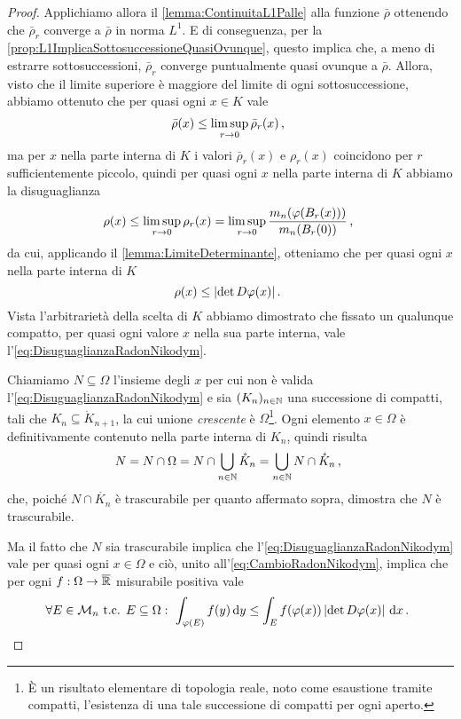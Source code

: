 \begin{proof}
	Applichiamo allora il \cref{lemma:ContinuitaL1Palle} alla funzione $\bar\rho$ ottenendo che $\bar\rho_r$ converge a $\bar\rho$ in norma $L^1$.
	E di conseguenza, per la \cref{prop:L1ImplicaSottosuccessioneQuasiOvunque}, questo implica che, a meno di estrarre sottosuccessioni, $\bar\rho_r$ converge puntualmente quasi ovunque a $\bar\rho$.
	Allora, visto che il limite superiore è maggiore del limite di ogni sottosuccessione, abbiamo ottenuto che per quasi ogni $x\in K$ vale
	\begin{equation*}
		\bar\rho(x)\le \limsup_{r\to 0} \bar\rho_r(x)\, \text{, }
	\end{equation*}
	ma per $x$ nella parte interna di $K$ i valori $\bar\rho_r(x)$ e $\rho_r(x)$ coincidono per $r$ sufficientemente piccolo, quindi per quasi ogni $x$ nella parte interna di $K$ abbiamo la disuguaglianza
	\begin{equation*}
		\rho(x)\le \limsup_{r\to 0} \rho_r(x)=\limsup_{r\to 0} \frac{m_n(\varphi(B_r(x)))}{m_n(B_r(0))}\, \text{, }
	\end{equation*}
	da cui, applicando il \cref{lemma:LimiteDeterminante}, otteniamo che per quasi ogni $x$ nella parte interna di $K$
	\begin{equation}\label{eq:DisuguaglianzaRadonNikodym}
		\rho(x)\le \lvert \det D\varphi(x)\rvert \, \text{. }
	\end{equation}
	Vista l'arbitrarietà della scelta di $K$ abbiamo dimostrato che fissato un qualunque compatto, per quasi ogni valore $x$ nella sua parte interna, vale l'\cref{eq:DisuguaglianzaRadonNikodym}. 
	
	Chiamiamo $N\subseteq\Omega$ l'insieme degli $x$ per cui non è valida l'\cref{eq:DisuguaglianzaRadonNikodym} e sia $(K_n)_{n\in\mathbb N}$ una successione di compatti, tali che $K_n\subseteq \mathring K_{n+1}$, la cui unione \emph{crescente} è $\Omega$\footnote{È un risultato elementare di topologia reale, noto come esaustione tramite compatti, l'esistenza di una tale successione di compatti per ogni aperto.}.
	Ogni elemento $x\in\Omega$ è definitivamente contenuto nella parte interna di $K_n$, quindi risulta
	\begin{equation*}
		N=N\cap\Omega=N\cap\bigcup_{n\in\mathbb N} \mathring K_n=\bigcup_{n\in\mathbb N}N\cap\mathring K_n\, \text{, }
	\end{equation*}
	che, poiché $N\cap\mathring{K_n}$ è trascurabile per quanto affermato sopra, dimostra che $N$ è trascurabile.
	
	Ma il fatto che $N$ sia trascurabile implica che l'\cref{eq:DisuguaglianzaRadonNikodym} vale per quasi ogni $x\in\Omega$ e ciò, unito all'\cref{eq:CambioRadonNikodym}, implica che per ogni $f:\Omega\to\overline{\mathbb R}$ misurabile positiva vale
	\begin{equation*}
		\forall E\in \mathcal M_n\text{ t.c. } E\subseteq\Omega:\ \int_{\varphi(E)} f(y)\,\mathrm d y\le 
		\int_E f(\varphi(x))\left\lvert\det D\varphi(x)\right\rvert\,\mathrm d x \, \text{. }
	\end{equation*}
	

\end{proof}
